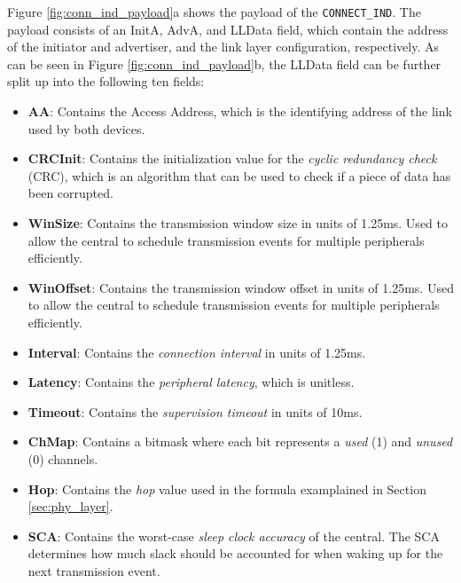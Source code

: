 Figure \ref{fig:conn_ind_payload}a shows the payload of the \texttt{CONNECT\_IND}. The payload consists of an InitA, AdvA, and LLData field, which contain the address of the initiator and advertiser, and the link layer configuration, respectively. As can be seen in Figure \ref{fig:conn_ind_payload}b, the LLData field can be further split up into the following ten fields:
\begin{itemize}
    \item \textbf{AA}: Contains the Access Address, which is the identifying address of the link used by both devices.
    \item \textbf{CRCInit}: Contains the initialization value for the \textit{cyclic redundancy check} (CRC), which is an algorithm that can be used to check if a piece of data has been corrupted.
    \item \textbf{WinSize}: Contains the transmission window size in units of 1.25ms. Used to allow the central to schedule transmission events for multiple peripherals efficiently.
    \item \textbf{WinOffset}: Contains the transmission window offset in units of 1.25ms. Used to allow the central to schedule transmission events for multiple peripherals efficiently.
    \item \textbf{Interval}: Contains the \textit{connection interval} in units of 1.25ms.
    \item \textbf{Latency}: Contains the \textit{peripheral latency}, which is unitless.
    \item \textbf{Timeout}: Contains the \textit{supervision timeout} in units of 10ms.
    \item \textbf{ChMap}: Contains a bitmask where each bit represents a \textit{used} (1) and \textit{unused} (0) channels.
    \item \textbf{Hop}: Contains the \textit{hop} value used in the formula examplained in Section \ref{sec:phy_layer}.
    \item \textbf{SCA}: Contains the worst-case \textit{sleep clock accuracy} of the central. The SCA determines how much slack should be accounted for when waking up for the next transmission event.
\end{itemize}

